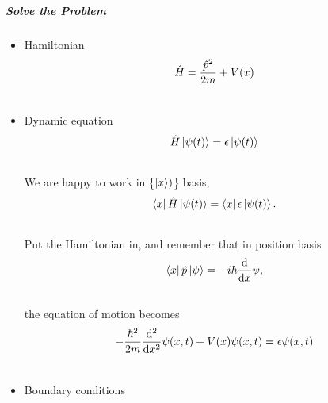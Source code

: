 \documentclass[letterpaper,10pt,english]{sphinxmanual}
\begin{document}
\subparagraph{Solve the Problem}
\label{QuantumMechanics:solve-the-problem}\begin{itemize}
\item {} 
Hamiltonian
\begin{gather}
\begin{split}\hat H = \frac{\hat p ^2}{2 m } + V(x)\end{split}\notag\\\begin{split}\end{split}\notag
\end{gather}
\item {} 
Dynamic equation
\begin{gather}
\begin{split}\hat H \left| \psi(t)\right\rangle = \epsilon \left| \psi(t)\right\rangle\end{split}\notag\\\begin{split}\end{split}\notag
\end{gather}
We are happy to work in \{$\left| x\right\rangle)$\} basis,
\begin{gather}
\begin{split}\left\langle x\right| \hat H \left| \psi(t)\right\rangle = \left\langle x\right| \epsilon \left| \psi(t)\right\rangle .\end{split}\notag\\\begin{split}\end{split}\notag
\end{gather}
Put the Hamiltonian in, and remember that in position basis
\begin{gather}
\begin{split}\left\langle x\right| \hat p \left| \psi\right\rangle = - i \hbar\frac{\mathrm{d}}{\mathrm{d} x} \psi ,\end{split}\notag\\\begin{split}\end{split}\notag
\end{gather}
the equation of motion becomes
\begin{gather}
\begin{split}- \frac{\hbar ^2}{2 m} \frac{\mathrm{d}^2}{\mathrm{d} x^2} \psi(x,t) + V(x) \psi(x,t) = \epsilon \psi(x,t)\end{split}\notag\\\begin{split}\end{split}\notag
\end{gather}
\item {} 
Boundary conditions

\end{itemize}
\end{document}
